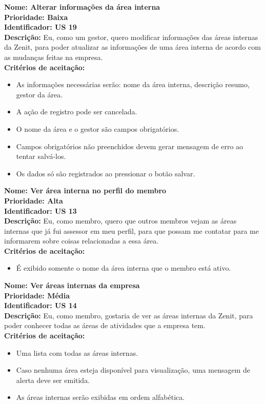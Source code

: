 \begin{anexosenv}
\textbf{Nome: Alterar informações da área interna\\
Prioridade: Baixa\\
Identificador: US 19\\
Descrição: }Eu, como um gestor, quero modificar informações das áreas internas da Zenit, para poder atualizar as informações de uma área interna de acordo com as mudanças feitas na empresa.\\
\textbf{Critérios de aceitação:}
\begin{itemize}
    \item As informações necessárias serão: nome da área interna, descrição resumo, gestor da área.
    \item A ação de registro pode ser cancelada.
    \item O nome da área e o gestor são campos obrigatórios.
    \item Campos obrigatórios não preenchidos devem gerar mensagem de erro ao tentar salvá-los.
    \item Os dados só são registrados ao pressionar o botão salvar.
\end{itemize}

\textbf{Nome: Ver área interna no perfil do membro\\
Prioridade: Alta\\
Identificador: US 13\\
Descrição: }Eu, como membro, quero que outros membros vejam as áreas internas que já fui assessor em meu perfil, para que possam me contatar para me informarem sobre coisas relacionadas a essa área.\\
\textbf{Critérios de aceitação:}
\begin{itemize}
    \item É exibido somente o nome da área interna que o membro está ativo.
\end{itemize}

\textbf{Nome: Ver áreas internas da empresa\\
Prioridade: Média\\
Identificador: US 14\\
Descrição: }Eu, como membro, gostaria de ver as áreas internas da Zenit, para poder conhecer todas as áreas de atividades que a empresa tem.\\
\textbf{Critérios de aceitação:}
\begin{itemize}
    \item Uma lista com todas as áreas internas.
    \item Caso nenhuma área esteja disponível para visualização, uma mensagem de alerta deve ser emitida.
    \item As áreas internas serão exibidas em ordem alfabética.
\end{itemize}


\end{anexosenv}
